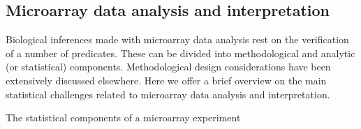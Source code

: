 


\subsection{Microarray data analysis and interpretation}
\label{sec:discussion-interpretation-microarrays}
Biological inferences made with microarray data analysis rest on the
verification of a number of predicates.  These can be divided into methodological
and analytic (or statistical) components.  Methodological design considerations
have been extensively discussed
elsewhere.\cite{kerr_experimental_2001,churchill_fundamentals_2002,yang_design_2002,kerr_design_2003,yang_microarray_2003}
Here we offer a brief overview on the main statistical challenges related to
microarray data analysis and interpretation.

The statistical components of a microarray experiment



\clearpage


